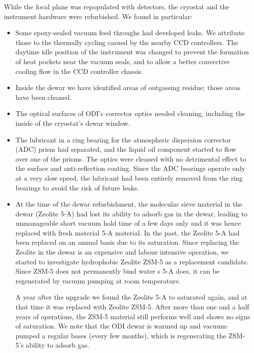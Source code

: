 \documentclass[]{spieman}
\begin{document}
While the focal plane was repopulated with detectors, the cryostat and the 
instrument hardware were refurbished. We found in particular:
\begin{itemize}
	\item Some epoxy-sealed vacuum feed throughs had developed  leaks. We 
	attribute those to the thermally cycling casued by the nearby CCD controllers. 
	The daytime idle position of the instrument was changed to prevent the 
	formation of heat pockets near the vacuum seals, and to allow a better
	convective cooling flow in the CCD controller chassis.
	
	\item Inside the dewar we have identified areas of outgassing residue; 
	those areas have been cleaned. 
	
	\item The optical surfaces of ODI's corrector optics needed cleaning,
	 including the inside of the cryostat's dewar window. 
	
	\item The lubricant in a ring bearing for the atmospheric dispersion 
	corrector (ADC) prism had separated, and the liquid oil component started to 
	flow over one of the prisms. The optics were cleaned with no detrimental effect 
	to the surface and anti-reflection coating. Since the ADC bearings operate 
	only at a very slow speed, the lubricant had been entirely removed from the 
	ring bearings to avoid the risk of future leaks. 
	

\item  At the time of the dewar refurbishment, the molecular sieve material in
the dewar (Zeolite 5-A) had lost its ability to adsorb gas in the dewar, leading
to unmanageable short vacuum hold time of a few days only and it was hence 
replaced with fresh material 5-A material. In the past, the Zeolite 5-A had been
replaced on an annual basis due to its saturation. Since replacing the Zeolite
in the dewar is an expensive and labour intensive operation, we started to
investigate hydrophobic Zeolite ZSM-5 as a replacement candidate. Since ZSM-5
does not permanently bind water s 5-A does, it can be regenerated by vacuum
pumping at room temperature.

A year after the upgrade we found the Zeolite 5-A to  saturated again, and at
that time it was replaced with Zeolite ZSM-5. After more than one and a half years of
operations, the ZSM-5 material still performs well and shows no signs of
saturation. We note that the ODI dewar is warmed up and vacuum-pumped a regular
bases (every few months), which is regenerating the ZSM-5's ability to adsorb
gas.

\end{itemize}
\end{document}
